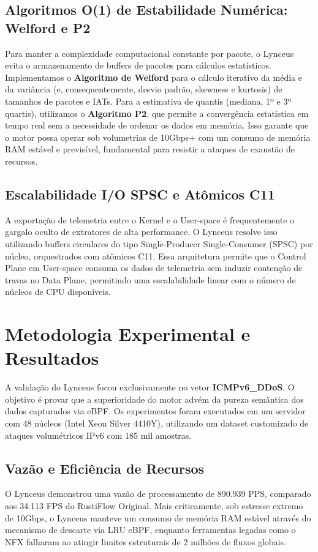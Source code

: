 \documentclass[12pt]{article}
\begin{document}
\subsection{Algoritmos O(1) de Estabilidade Numérica: Welford e P2}
Para manter a complexidade computacional constante por pacote, o Lynceus evita o armazenamento de buffers de pacotes para cálculos estatísticos. Implementamos o \textbf{Algoritmo de Welford} para o cálculo iterativo da média e da variância (e, consequentemente, desvio padrão, skewness e kurtosis) de tamanhos de pacotes e IATs. Para a estimativa de quantis (mediana, 1º e 3º quartis), utilizamos o \textbf{Algoritmo P2}, que permite a convergência estatística em tempo real sem a necessidade de ordenar os dados em memória. Isso garante que o motor possa operar sob volumetrias de 10Gbps+ com um consumo de memória RAM estável e previsível, fundamental para resistir a ataques de exaustão de recursos.

\subsection{Escalabilidade I/O SPSC e Atômicos C11}
A exportação de telemetria entre o Kernel e o User-space é frequentemente o gargalo oculto de extratores de alta performance. O Lynceus resolve isso utilizando buffers circulares do tipo Single-Producer Single-Consumer (SPSC) por núcleo, orquestrados com atômicos C11. Essa arquitetura permite que o Control Plane em User-space consuma os dados de telemetria sem induzir contenção de travas no Data Plane, permitindo uma escalabilidade linear com o número de núcleos de CPU disponíveis.

\section{Metodologia Experimental e Resultados}
A validação do Lynceus focou exclusivamente no vetor \textbf{ICMPv6\_DDoS}. O objetivo é provar que a superioridade do motor advém da pureza semântica dos dados capturados via eBPF. Os experimentos foram executados em um servidor com 48 núcleos (Intel Xeon Silver 4410Y), utilizando um dataset customizado de ataques volumétricos IPv6 com 185 mil amostras.

\subsection{Vazão e Eficiência de Recursos}
O Lynceus demonstrou uma vazão de processamento de 890.939 PPS, comparado aos 34.113 FPS do RustiFlow Original. Mais criticamente, sob estresse extremo de 10Gbps, o Lynceus manteve um consumo de memória RAM estável através do mecanismo de descarte via LRU eBPF, enquanto ferramentas legadas como o NFX falharam ao atingir limites estruturais de 2 milhões de fluxos globais.
\end{document}
